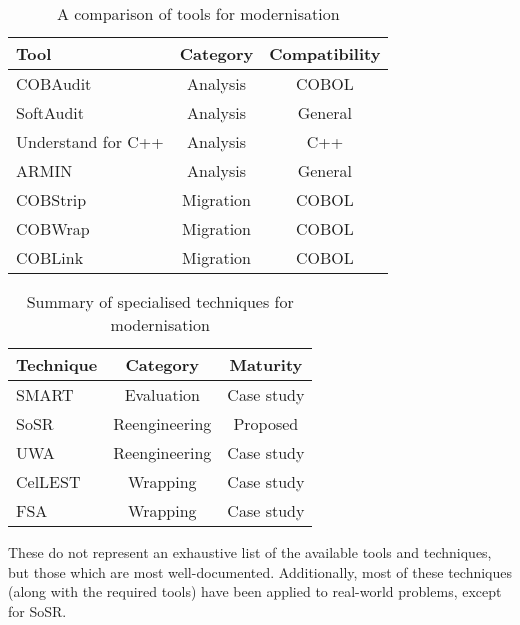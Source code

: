\documentclass[12pt,journal,compsoc]{IEEEtran}
\begin{document}
\begin{table}[h!]
\caption{A comparison of tools for modernisation}
\label{table:tools}
\centering
\begin{tabular}{| l | c | c |}
  \hline
  \textbf{Tool} & \textbf{Category} & \textbf{Compatibility} \\ \hline
  COBAudit & Analysis & COBOL \\ \hline
  SoftAudit & Analysis & General \\ \hline
  Understand for C++ & Analysis & C++ \\ \hline
  ARMIN & Analysis & General \\ \hline
  COBStrip & Migration & COBOL \\ \hline
  COBWrap & Migration & COBOL \\ \hline
  COBLink & Migration & COBOL \\ \hline
\end{tabular}
\end{table}

\begin{table}[h!]
\caption{Summary of specialised techniques for modernisation}
\label{table:techniques}
\centering
\begin{tabular}{| l | c | c |}
  \hline
  \textbf{Technique} & \textbf{Category} & \textbf{Maturity} \\ \hline
  SMART & Evaluation & Case study \\ \hline
  SoSR & Reengineering & Proposed \\ \hline
  UWA & Reengineering & Case study \\ \hline
  CelLEST & Wrapping & Case study \\ \hline
  FSA & Wrapping & Case study \\ \hline
\end{tabular}
\end{table}

These do not represent an exhaustive list of the available tools and techniques, but those which are most well-documented. Additionally, most of these techniques (along with the required tools) have been applied to real-world problems, except for SoSR.
\end{document}
